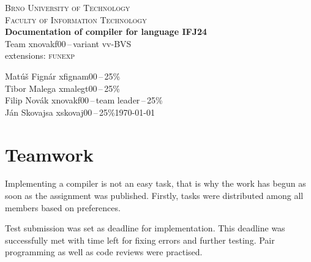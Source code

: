 \documentclass[a4paper, 11pt]{article}
\begin{document}
\begin{titlepage}
    \begin{center}
        \textsc{\Huge{Brno University of Technology\\[0.4em]}
        \huge{Faculty of Information Technology}}\\        
        \huge{\textbf{Documentation of compiler for language \textsc{IFJ24}}}\\
        \LARGE{Team xnovakf00\,--\,variant vv-BVS}\\
        \Large{extensions: \textsc{funexp}}\\
    \end{center}
    \Large{Matúš Fignár xfignam00\,--\,25\%\\
            Tibor Malega xmalegt00\,--\,25\%\\
            Filip Novák xnovakf00\,--\,team leader\,--\,25\%\\
            Ján Skovajsa xskovaj00\,--\,25\%\hfill \today}
\end{titlepage}

\tableofcontents
\newpage
\listoffigures
\newpage





\section{Teamwork}\label{sec:TEAM}
Implementing a compiler is not an easy task, that is why the work has begun as soon as 
the assignment was published. Firstly, tasks were distributed among all members based on 
preferences.\par 
Test submission was set as deadline for implementation. This deadline
was successfully met with time left for fixing errors and further testing. Pair programming as well as 
code reviews were practised. 
\end{document}
